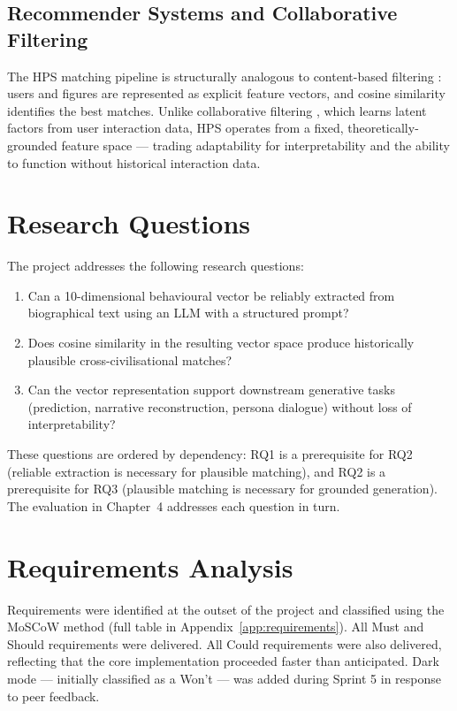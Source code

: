 \documentclass[11pt, a4paper]{report}
\begin{document}
\subsection{Recommender Systems and Collaborative Filtering}

The HPS matching pipeline is structurally analogous to content-based filtering \citep{pazzani2007}: users and figures are represented as explicit feature vectors, and cosine similarity identifies the best matches. Unlike collaborative filtering \citep{koren2009}, which learns latent factors from user interaction data, HPS operates from a fixed, theoretically-grounded feature space — trading adaptability for interpretability and the ability to function without historical interaction data.

\section{Research Questions}

The project addresses the following research questions:

\begin{enumerate}
  \item Can a 10-dimensional behavioural vector be reliably extracted from biographical text using an LLM with a structured prompt?
  \item Does cosine similarity in the resulting vector space produce historically plausible cross-civilisational matches?
  \item Can the vector representation support downstream generative tasks (prediction, narrative reconstruction, persona dialogue) without loss of interpretability?
\end{enumerate}

These questions are ordered by dependency: RQ1 is a prerequisite for RQ2 (reliable extraction is necessary for plausible matching), and RQ2 is a prerequisite for RQ3 (plausible matching is necessary for grounded generation). The evaluation in Chapter~4 addresses each question in turn.

\section{Requirements Analysis}

Requirements were identified at the outset of the project and classified using the MoSCoW method (full table in Appendix~\ref{app:requirements}). All Must and Should requirements were delivered. All Could requirements were also delivered, reflecting that the core implementation proceeded faster than anticipated. Dark mode — initially classified as a Won't — was added during Sprint 5 in response to peer feedback.
\end{document}
